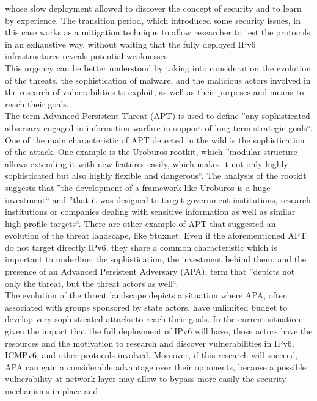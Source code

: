 \documentclass[12pt]{article}
\begin{document}
whose slow deployment allowed to discover the concept of security and to learn by experience. The transition period, which introduced some security issues, in this case works as a mitigation technique to allow researcher 
to test the protocols in an exhaustive way, without waiting that the fully deployed IPv6 infrastructures reveals potential weaknesses.\\
This urgency can be better understood by taking into consideration the evolution of the threats, the sophistication of malware, and the malicious actors involved in the research of vulnerabilities to exploit, as well as 
their purposes and means to reach their goals.\\
The term Advanced Persistent Threat (APT) is used to define ''any sophisticated adversary engaged in information warfare in support of long-term strategic goals``\cite{apt}. One of the main characteristic of APT detected 
in the wild is the sophistication of the attack. One example is the Uroburos rootkit\cite{uroburos}, which ''modular structure allows extending it with new features easily, which makes it not only highly sophisticated 
but also highly flexible and dangerous``. The analysis of the rootkit suggests that ''the development of a framework like Uroburos is a huge investment`` and ''that it was designed to target government institutions, 
research institutions or companies dealing with sensitive information as well as similar high-profile targets``. There are other example of APT that suggested an evolution of the threat landscape, like Stuxnet\cite{stuxnet}.
Even if the aforementioned APT do not target directly IPv6, they share a common characteristic which is important to underline: the sophistication, the investment behind them, and the presence of an Advanced Persistent 
Adversary (APA)\cite{apa}, term that ''depicts not only the threat, but the threat actors as well``.\\
The evolution of the threat landscape depicts a situation where APA, often associated with groups sponsored by state actors, have unlimited budget to develop very sophisticated attacks to reach their goals. In the current 
situation, given the impact that the full deployment of IPv6 will have, those actors have the resources and the motivation to research and discover vulnerabilities in IPv6, ICMPv6, and other protocols involved. 
Moreover, if this research will succeed, APA can gain a considerable advantage over their opponents, because a possible vulnerability at network layer may allow to bypass more easily the security mechanisms in place and 
\end{document}
